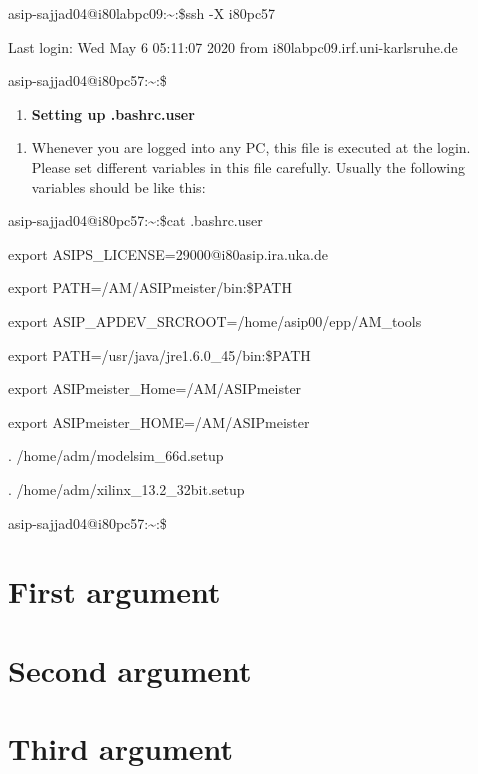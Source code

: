 \documentclass{article}
\begin{document}
asip-sajjad04@i80labpc09:\textasciitilde:\$ssh -X i80pc57

Last login: Wed May 6 05:11:07 2020 from i80labpc09.irf.uni-karlsruhe.de

asip-sajjad04@i80pc57:\textasciitilde:\$

\begin{enumerate}
\def\labelenumi{\Alph{enumi}.}
\setcounter{enumi}{9}
\item
  \textbf{Setting up .bashrc.user}
\end{enumerate}

\begin{enumerate}
\def\labelenumi{\arabic{enumi}.}
\setcounter{enumi}{12}
\item
  Whenever you are logged into any PC, this file is executed at the
  login. Please set different variables in this file carefully. Usually
  the following variables should be like this:
\end{enumerate}

asip-sajjad04@i80pc57:\textasciitilde:\$cat .bashrc.user

export ASIPS\_LICENSE=29000@i80asip.ira.uka.de

export PATH=/AM/ASIPmeister/bin:\$PATH

export ASIP\_APDEV\_SRCROOT=/home/asip00/epp/AM\_tools

export PATH=/usr/java/jre1.6.0\_45/bin:\$PATH

export ASIPmeister\_Home=/AM/ASIPmeister

export ASIPmeister\_HOME=/AM/ASIPmeister

. /home/adm/modelsim\_66d.setup

. /home/adm/xilinx\_13.2\_32bit.setup

asip-sajjad04@i80pc57:\textasciitilde:\$
\section{First argument}

\section{Second argument}

\section{Third argument}


\printbibliography
\printindex
\end{document}
